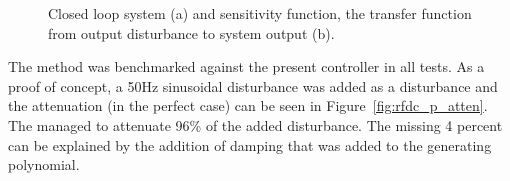 \begin{figure}[h!]
  \centering %
  \qquad
  \caption{\label{fig:rfdc_s_gc} Closed loop system (a) and sensitivity function, the transfer function from output disturbance to system output (b).}
\end{figure}

\FloatBarrier
The \abbrIMP method was benchmarked against the present controller in all tests. As a proof of concept, a 50Hz sinusoidal disturbance was added as a disturbance and the attenuation (in the perfect case) can be seen in Figure~\ref{fig:rfdc_p_atten}. The \abbrIMP managed to attenuate 96\% of the added disturbance. The missing 4 percent can be explained by the addition of damping that was added to the generating polynomial.

